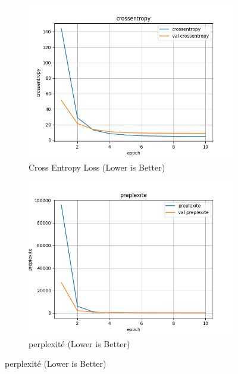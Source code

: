 \documentclass[a4paper]{article}
\begin{document}
\begin{figure}[ht]
  \centering
  \begin{subfigure}{0.47\textwidth}
    \includegraphics[width=\linewidth]{../logs/learnfromscratch/crossentropy.png}
    \caption{Cross Entropy Loss (Lower is Better)}
  \end{subfigure}
  \hfill
  \begin{subfigure}{0.47\textwidth}
    \includegraphics[width=\linewidth]{../logs/learnfromscratch/preplexite.png}
    \caption{perplexité (Lower is Better)}
  \end{subfigure}


\end{figure}
\end{document}
